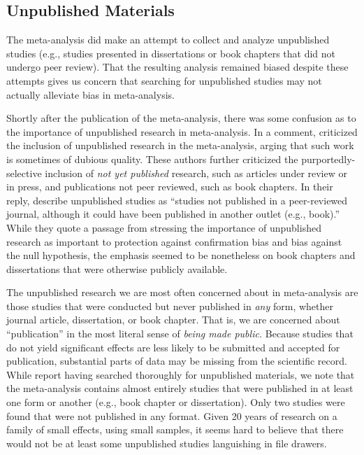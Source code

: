 \documentclass[man]{apa6}
\begin{document}
\subsection{Unpublished Materials}
The \citep{Anderson:etal:2010} meta-analysis did make an attempt to collect and analyze unpublished studies (e.g., studies presented in dissertations or book chapters that did not undergo peer review). That the resulting analysis remained biased despite these attempts gives us concern that searching for unpublished studies may not actually alleviate bias in meta-analysis. 

Shortly after the publication of the \citet{Anderson:etal:2010} meta-analysis, there was some confusion as to the importance of unpublished research in meta-analysis. In a comment, \citet{Ferguson:Kilburn:2010} %
criticized the inclusion of unpublished research in the meta-analysis, arging that such work is sometimes of dubious quality. These authors further criticized the purportedly-selective inclusion of {\em not yet published} research, such as articles under review or in press, and publications not peer reviewed, such as book chapters. In their reply, \citet{Bushman:etal:2010} describe unpublished studies as ``studies not published in a peer-reviewed journal, although it could have been published in another outlet (e.g., book).'' While they quote a passage from \citet{Cooper:2009} stressing the importance of unpublished research as important to protection against confirmation bias and bias against the null hypothesis, the emphasis seemed to be nonetheless on book chapters and dissertations that were otherwise publicly available.

The unpublished research we are most often concerned about in meta-analysis are those studies that were conducted but never published in {\em any} form, whether journal article, dissertation, or book chapter. That is, we are concerned about ``publication'' in the most literal sense of {\em being made public.}  Because studies that do not yield significant effects are less likely to be submitted and accepted for publication, substantial parts of data may be missing from the scientific record. While \citet{Anderson:etal:2010} report having searched thoroughly for unpublished materials, we note that the meta-analysis contains almost entirely studies that were published in at least one form or another (e.g., book chapter or dissertation). Only two studies were found that were not published in any format. Given 20 years of research on a family of small effects, using small samples, it seems hard to believe that there would not be at least some unpublished studies languishing in file drawers.
\end{document}
